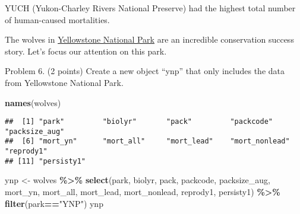 \documentclass[
]{article}
\newenvironment{Shaded}{\begin{snugshade}}{\end{snugshade}}
\newcommand{\FunctionTok}[1]{\textcolor[rgb]{0.13,0.29,0.53}{\textbf{#1}}}
\newcommand{\NormalTok}[1]{#1}
\newcommand{\OtherTok}[1]{\textcolor[rgb]{0.56,0.35,0.01}{#1}}
\newcommand{\SpecialCharTok}[1]{\textcolor[rgb]{0.81,0.36,0.00}{\textbf{#1}}}
\newcommand{\StringTok}[1]{\textcolor[rgb]{0.31,0.60,0.02}{#1}}
\begin{document}
YUCH (Yukon-Charley Rivers National Preserve) had the highest total
number of human-caused mortalities.

The wolves in
\href{https://www.nps.gov/yell/learn/nature/wolf-restoration.htm}{Yellowstone
National Park} are an incredible conservation success story. Let's focus
our attention on this park.

Problem 6. (2 points) Create a new object ``ynp'' that only includes the
data from Yellowstone National Park.

\begin{Shaded}
\begin{Highlighting}[]
\FunctionTok{names}\NormalTok{(wolves)}
\end{Highlighting}
\end{Shaded}

\begin{verbatim}
##  [1] "park"         "biolyr"       "pack"         "packcode"     "packsize_aug"
##  [6] "mort_yn"      "mort_all"     "mort_lead"    "mort_nonlead" "reprody1"    
## [11] "persisty1"
\end{verbatim}

\begin{Shaded}
\begin{Highlighting}[]
\NormalTok{ynp }\OtherTok{\textless{}{-}}\NormalTok{ wolves }\SpecialCharTok{\%\textgreater{}\%}
  \FunctionTok{select}\NormalTok{(park, biolyr, pack, packcode, packsize\_aug, mort\_yn, mort\_all, mort\_lead, mort\_nonlead, reprody1, persisty1) }\SpecialCharTok{\%\textgreater{}\%}
  \FunctionTok{filter}\NormalTok{(park}\SpecialCharTok{==}\StringTok{"YNP"}\NormalTok{)}
\NormalTok{ynp}
\end{Highlighting}
\end{Shaded}
\end{document}
